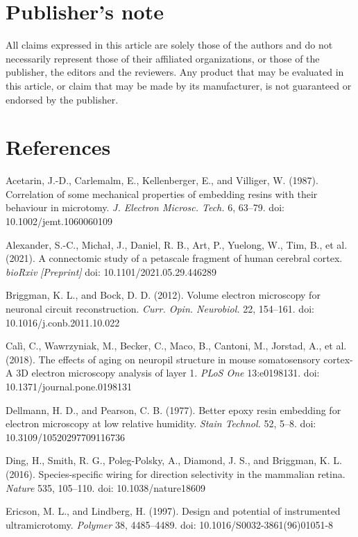 \documentclass{article}
\newenvironment{reflist}{\par\small\setlength{\parindent}{0pt}\everypar{\hangindent=2.2em\hangafter=1}}{\par}
\begin{document}
\section*{Publisher’s note}

All claims expressed in this article are solely those of the authors and do not necessarily represent those of their affiliated organizations, or those of the publisher, the editors and the reviewers. Any product that may be evaluated in this article, or claim that may be made by its manufacturer, is not guaranteed or endorsed by the publisher.

\section*{References}

\begin{reflist}
Acetarin, J.-D., Carlemalm, E., Kellenberger, E., and Villiger, W. (1987). Correlation of some mechanical properties of embedding resins with their behaviour in microtomy. \emph{J. Electron Microsc. Tech.} 6, 63–79. doi: 10.1002/jemt.1060060109

Alexander, S.-C., Michał, J., Daniel, R. B., Art, P., Yuelong, W., Tim, B., et al. (2021). A connectomic study of a petascale fragment of human cerebral cortex. \emph{bioRxiv} \emph{[Preprint]} doi: 10.1101/2021.05.29.446289

Briggman, K. L., and Bock, D. D. (2012). Volume electron microscopy for neuronal circuit reconstruction. \emph{Curr. Opin. Neurobiol.} 22, 154–161. doi: 10.1016/j.conb.2011.10.022

Calì, C., Wawrzyniak, M., Becker, C., Maco, B., Cantoni, M., Jorstad, A., et al. (2018). The effects of aging on neuropil structure in mouse somatosensory cortex-A 3D electron microscopy analysis of layer 1. \emph{PLoS One} 13:e0198131. doi: 10.1371/journal.pone.0198131

Dellmann, H. D., and Pearson, C. B. (1977). Better epoxy resin embedding for electron microscopy at low relative humidity. \emph{Stain Technol.} 52, 5–8. doi: 10.3109/10520297709116736

Ding, H., Smith, R. G., Poleg-Polsky, A., Diamond, J. S., and Briggman, K. L. (2016). Species-specific wiring for direction selectivity in the mammalian retina. \emph{Nature} 535, 105–110. doi: 10.1038/nature18609

Ericson, M. L., and Lindberg, H. (1997). Design and potential of instrumented ultramicrotomy. \emph{Polymer} 38, 4485–4489. doi: 10.1016/S0032-3861(96)01051-8


\end{reflist}
\end{document}
